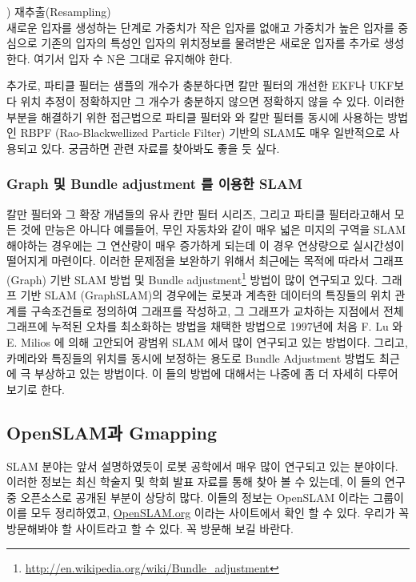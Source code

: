\vspace{\baselineskip}
\noindent
{}
\thenum) 재추출(Resampling)\\
새로운 입자를 생성하는 단계로 가중치가 작은 입자를 없애고 가중치가 높은 입자를 중심으로 기존의 입자의 특성인 입자의 위치정보를 물려받은 새로운 입자를 추가로 생성한다. 여기서 입자 수 N은 그대로 유지해야 한다.

추가로, 파티클 필터는 샘플의 개수가 충분하다면 칼만 필터의 개선한 EKF나 UKF보다 위치 추정이 정확하지만 그 개수가 충분하지 않으면 정확하지 않을 수 있다. 이러한 부분을 해결하기 위한 접근법으로 파티클 필터와 와 칼만 필터를 동시에 사용하는 방법인 RBPF (Rao-Blackwellized Particle Filter)\cite{grisetti2005improving}\cite{grisetti2007improved} 기반의 SLAM도 매우 일반적으로 사용되고 있다. 궁금하면 관련 자료를 찾아봐도 좋을 듯 싶다.


\subsubsection{Graph 및 Bundle adjustment 를 이용한 SLAM}

칼만 필터와 그 확장 개념들의 유사 칸만 필터 시리즈, 그리고 파티클 필터라고해서 모든 것에 만능은 아니다 예를들어, 무인 자동차와 같이 매우 넓은 미지의 구역을 SLAM 해야하는 경우에는 그 연산량이 매우 증가하게 되는데 이 경우 연상량으로 실시간성이 떨어지게 마련이다. 이러한 문제점을 보완하기 위해서 최근에는 목적에 따라서 그래프(Graph) 기반 SLAM 방법 및 Bundle adjustment\footnote{\url{http://en.wikipedia.org/wiki/Bundle_adjustment}} 방법이 많이 연구되고 있다. 그래프 기반 SLAM (GraphSLAM)의 경우에는 로봇과 계측한 데이터의 특징들의 위치 관계를 구속조건들로 정의하여 그래프를 작성하고, 그 그래프가 교차하는 지점에서 전체 그래프에 누적된 오차를 최소화하는 방법을 채택한 방법으로 1997년에 처음 F. Lu 와 E. Milios 에 의해 고안되어 광범위 SLAM 에서 많이 연구되고 있는 방법이다. 그리고, 카메라와 특징들의 위치를 동시에 보정하는 용도로 Bundle Adjustment 방법도 최근에 극 부상하고 있는 방법이다. 이 들의 방법에 대해서는 나중에 좀 더 자세히 다루어 보기로 한다.


\subsection{OpenSLAM과 Gmapping}

SLAM 분야는 앞서 설명하였듯이 로봇 공학에서 매우 많이 연구되고 있는 분야이다. 이러한 정보는 최신 학술지 및 학회 발표 자료를 통해 찾아 볼 수 있는데, 이 들의 연구 중 오픈소스로 공개된 부분이 상당히 많다. 이들의 정보는 OpenSLAM 이라는 그룹이 이를 모두 정리하였고, \url{OpenSLAM.org} 이라는 사이트에서 확인 할 수 있다. 우리가 꼭 방문해봐야 할 사이트라고 할 수 있다. 꼭 방문해 보길 바란다.

